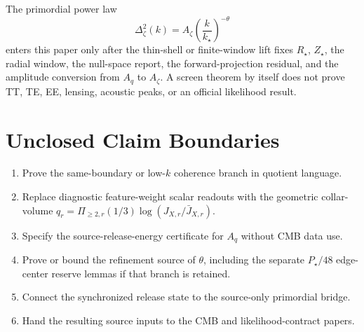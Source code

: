 \documentclass[11pt]{article}
\theoremstyle{remark}
\theoremstyle{plain}
\begin{document}
The primordial power law
\[
  \Delta_\zeta^2(k)=A_\zeta\left(\frac{k}{k_\star}\right)^{-\theta}
\]
enters this paper only after the thin-shell or finite-window lift fixes \(R_\star\), \(Z_\star\),
the radial window, the null-space report, the forward-projection residual, and the amplitude
conversion from \(A_q\) to \(A_\zeta\).  A screen theorem by itself does not prove TT, TE, EE,
lensing, acoustic peaks, or an official likelihood result.

\section{Unclosed Claim Boundaries}

\begin{enumerate}[leftmargin=2em]
\item Prove the same-boundary or low-\(k\) coherence branch in quotient language.
\item Replace diagnostic feature-weight scalar readouts with the geometric collar-volume
\(q_r=\Pi_{\ge2,r}(1/3)\log(J_{X,r}/\bar J_{X,r})\).
\item Specify the source-release-energy certificate for \(A_q\) without CMB data use.
\item Prove or bound the refinement source of \(\theta\), including the separate \(P_\star/48\)
edge-center reserve lemmas if that branch is retained.
\item Connect the synchronized release state to the source-only primordial bridge.
\item Hand the resulting source inputs to the CMB and likelihood-contract papers.
\end{enumerate}
\end{document}
